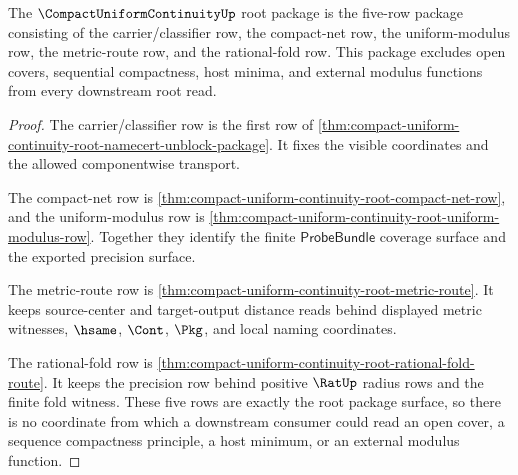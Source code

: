 \begin{theorem}
\label{thm:compact-uniform-continuity-root-nonescape-package}
The $\CompactUniformContinuityUp$ root package is the five-row package consisting of the carrier/classifier row, the compact-net row, the uniform-modulus row, the metric-route row, and the rational-fold row. This package excludes open covers, sequential compactness, host minima, and external modulus functions from every downstream root read.
\end{theorem}
\begin{proof}
The carrier/classifier row is the first row of \autoref{thm:compact-uniform-continuity-root-namecert-unblock-package}. It fixes the visible coordinates and the allowed componentwise transport.

The compact-net row is \autoref{thm:compact-uniform-continuity-root-compact-net-row}, and the uniform-modulus row is \autoref{thm:compact-uniform-continuity-root-uniform-modulus-row}. Together they identify the finite $\mathsf{ProbeBundle}$ coverage surface and the exported precision surface.

The metric-route row is \autoref{thm:compact-uniform-continuity-root-metric-route}. It keeps source-center and target-output distance reads behind displayed metric witnesses, $\hsame$, $\Cont$, $\Pkg$, and local naming coordinates.

The rational-fold row is \autoref{thm:compact-uniform-continuity-root-rational-fold-route}. It keeps the precision row behind positive $\RatUp$ radius rows and the finite fold witness. These five rows are exactly the root package surface, so there is no coordinate from which a downstream consumer could read an open cover, a sequence compactness principle, a host minimum, or an external modulus function.
\end{proof}


